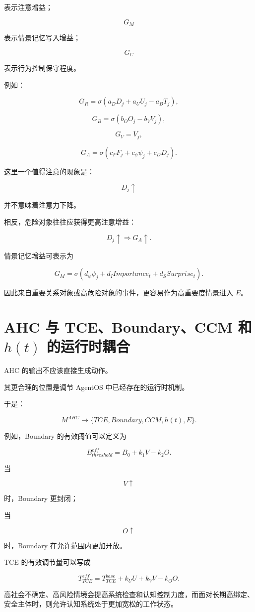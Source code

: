 表示注意增益；

\[
G_M
\]

表示情景记忆写入增益；

\[
G_C
\]

表示行为控制保守程度。

例如：

\[
G_R
=
\sigma
\left(
a_DD_j
+
a_UU_j
-
a_BT_j
\right),
\]

\[
G_B
=
\sigma
\left(
b_OO_j
-
b_VV_j
\right),
\]

\[
G_V=V_j,
\]

\[
G_A
=
\sigma
\left(
c_FF_j
+
c_\psi\psi_j
+
c_DD_j
\right).
\]

这里一个值得注意的现象是：

\[
D_j\uparrow
\]

并不意味着注意力下降。

相反，危险对象往往应获得更高注意增益：

\[
D_j\uparrow
\Rightarrow
G_A\uparrow.
\]

情景记忆增益可表示为

\[
G_M
=
\sigma
\left(
d_\psi\psi_j
+
d_IImportance_t
+
d_SSurprise_t
\right).
\]

因此来自重要关系对象或高危险对象的事件，更容易作为高重要度情景进入 $E$。


\section{AHC 与 TCE、Boundary、CCM 和 $h(t)$ 的运行时耦合}

AHC 的输出不应该直接生成动作。

其更合理的位置是调节 AgentOS 中已经存在的运行时机制。

于是：

\[
M^{AHC}
\rightarrow
\{
TCE,
Boundary,
CCM,
h(t),
E
\}.
\]

例如，Boundary 的有效阈值可以定义为

\[
B_{threshold}^{eff}
=
B_0
+
k_1V
-
k_2O.
\]

当

\[
V\uparrow
\]

时，Boundary 更封闭；

当

\[
O\uparrow
\]

时，Boundary 在允许范围内更加开放。

TCE 的有效调节量可以写成

\[
T_{TCE}^{eff}
=
T_{TCE}^{base}
+
k_UU
+
k_VV
-
k_OO.
\]

高社会不确定、高风险情境会提高系统检查和认知控制力度，而面对长期高绑定、安全主体时，则允许认知系统处于更加宽松的工作状态。

